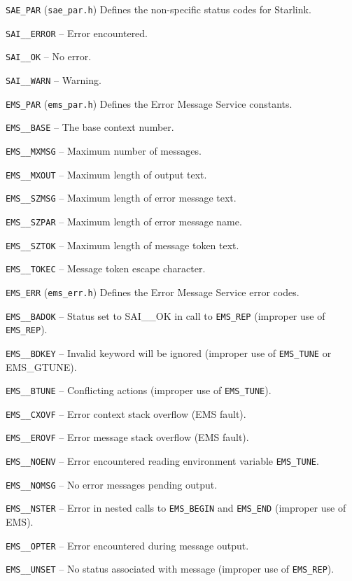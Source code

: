 \documentclass[twoside,11pt]{starlink}
\begin{document}
\begin {description}
\item \texttt{SAE\_PAR} (\texttt{sae\_par.h}) Defines the non-specific status
codes for Starlink.
\begin{description}
\item \texttt{SAI\_\_ERROR} -- Error encountered.
\item \texttt{SAI\_\_OK} -- No error.
\item \texttt{SAI\_\_WARN} -- Warning.
\end {description}

\item \texttt{EMS\_PAR} (\texttt{ems\_par.h}) Defines the Error Message Service
constants.
\begin{description}
\item \texttt{EMS\_\_BASE} -- The base context number.
\item \texttt{EMS\_\_MXMSG} -- Maximum number of messages.
\item \texttt{EMS\_\_MXOUT} -- Maximum length of output text.
\item \texttt{EMS\_\_SZMSG} -- Maximum length of error message text.
\item \texttt{EMS\_\_SZPAR} -- Maximum length of error message name.
\item \texttt{EMS\_\_SZTOK} -- Maximum length of message token text.
\item \texttt{EMS\_\_TOKEC} -- Message token escape character.
\end{description}

\item \texttt{EMS\_ERR} (\texttt{ems\_err.h}) Defines the Error Message Service
error codes.
\begin{description}
\item \texttt{EMS\_\_BADOK} -- Status set to SAI\_\_OK in call to
\texttt{EMS\_REP}
(improper use of \texttt{EMS\-\_REP}).
\item \texttt{EMS\_\_BDKEY} -- Invalid keyword will be ignored (improper use
of \texttt{EMS\_TUNE} or EMS\_GTUNE).
\item \texttt{EMS\_\_BTUNE} -- Conflicting actions (improper use of
\texttt{EMS\_TUNE}).
\item \texttt{EMS\_\_CXOVF} -- Error context stack overflow (EMS fault).
\item \texttt{EMS\_\_EROVF} -- Error message stack overflow (EMS fault).
\item \texttt{EMS\_\_NOENV} -- Error encountered reading environment variable
\texttt{EMS\_TUNE}.
\item \texttt{EMS\_\_NOMSG} -- No error messages pending output.
\item \texttt{EMS\_\_NSTER} -- Error in nested calls to \texttt{EMS\_BEGIN}
and \texttt{EMS\_END}
(improper use of EMS).
\item \texttt{EMS\_\_OPTER} -- Error encountered during message output.
\item \texttt{EMS\_\_UNSET} -- No status associated with message (improper
use of \texttt{EMS\_REP}).
\end{description}
\end {description}
\end{document}
